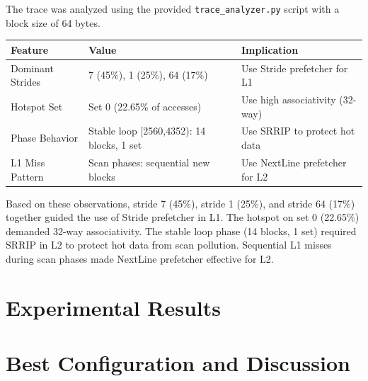 \documentclass[11pt]{article}
\begin{document}
The trace was analyzed using the provided \texttt{trace\_analyzer.py} script with a block size of 64 bytes. 
\begin{table}[h]
\centering
\begin{tabular}{|l|l|l|}
\hline
\textbf{Feature} & \textbf{Value} & \textbf{Implication} \\
\hline
Dominant Strides & 7 (45\%), 1 (25\%), 64 (17\%) & Use Stride prefetcher for L1 \\
\hline
Hotspot Set & Set 0 (22.65\% of accesses) & Use high associativity (32-way) \\
\hline
Phase Behavior & Stable loop [2560,4352): 14 blocks, 1 set & Use SRRIP to protect hot data \\
\hline
L1 Miss Pattern & Scan phases: sequential new blocks & Use NextLine prefetcher for L2 \\
\hline
\end{tabular}
\end{table}
\newline
Based on these observations, stride 7 (45\%), stride 1 (25\%), and stride 64 (17\%) together guided the use of Stride prefetcher in L1. The hotspot on set 0 (22.65\%) demanded 32-way associativity. The stable loop phase (14 blocks, 1 set) required SRRIP in L2 to protect hot data from scan pollution. Sequential L1 misses during scan phases made NextLine prefetcher effective for L2.

\section{Experimental Results}



\section{Best Configuration and Discussion}
\end{document}
